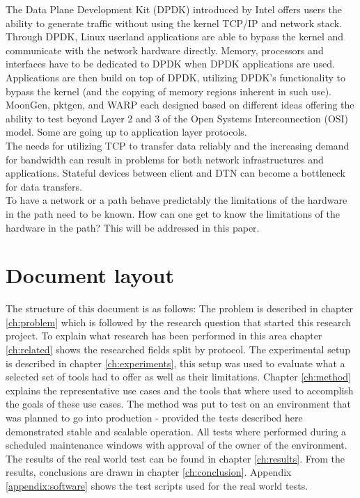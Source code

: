 The Data Plane Development Kit\cite{dpdk} (DPDK) introduced by Intel offers users the ability to generate traffic without using the kernel TCP/IP and network stack.  
Through DPDK, Linux userland applications are able to bypass the kernel and communicate with the network hardware directly. Memory, processors and interfaces have to be dedicated to DPDK  when DPDK applications are used.
Applications are then build on top of DPDK, utilizing DPDK's functionality to bypass the kernel (and the copying of memory regions inherent in such use). MoonGen\cite{moongen}, pktgen\cite{pktgen-dpdk}, and WARP\cite{warp} each designed based on different ideas offering the ability to test beyond Layer 2 and 3 of the Open Systems Interconnection (OSI) model.
Some are going up to application layer protocols.\\ 

The needs for utilizing TCP to transfer data reliably and the increasing demand for bandwidth can result in problems for both network infrastructures and applications. 
Stateful devices between client and DTN can become a bottleneck for data transfers.\\ 
To have a network or a path behave predictably the limitations of the hardware in the path need to be known.
How can one get to know the limitations of the hardware in the path?
This will be addressed in this paper.  

\section{Document layout}\label{sec:layout}

The structure of this document is as follows: The problem is described in chapter \ref{ch:problem} which is followed by the research question that started this research project. To explain what research has been performed in this area chapter \ref{ch:related} shows the researched fields split by protocol. The experimental setup is described in chapter \ref{ch:experiments}, this setup was used to evaluate what a selected set of tools had to offer as well as their limitations.
Chapter \ref{ch:method} explains the representative use cases and the tools that where used to accomplish the goals of these use cases. The method was put to test on an environment that was planned to go into production - provided the tests described here demonstrated stable and scalable operation. All tests where performed during a scheduled maintenance windows with approval of the owner of the environment. The results of the real world test can be found in chapter \ref{ch:results}. 
From the results, conclusions are drawn in chapter \ref{ch:conclusion}. Appendix \ref{appendix:software} shows the test scripts used for the real world tests. 

